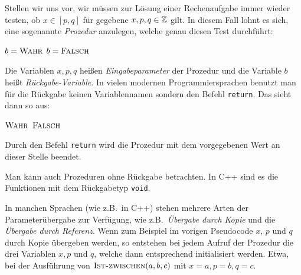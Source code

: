 \begin{bem} 
Stellen wir uns vor, wir müssen zur Lösung einer Rechenaufgabe immer wieder testen, ob $ x \in [p,q]$ für gegebene $x,p,q \in \mathbb{Z}$ gilt. In diesem Fall lohnt es sich, eine sogenannte \emph{Prozedur} anzulegen, welche genau diesen Test durchführt:

\begin{algorithm}[H]
	\caption{$b=\cc{Ist-zwischen}(x,p,q)$}
	\begin{algorithmic}
		\STATE $b=\mathop{\text{\textsc{Wahr}}}$
		\ENDIF
		\STATE $b=\mathop{\text{\textsc{Falsch}}}$
	\end{algorithmic}
\end{algorithm}

Die Variablen $x,p,q$ heißen \emph{Eingabeparameter} der Prozedur und die Variable $b$ heißt \emph{Rückgabe-Variable}. In vielen modernen Programmiersprachen benutzt man für die Rückgabe keinen Variablennamen sondern den Befehl \texttt{return}. Das sieht dann so aus: 

\begin{algorithm}[H]
	\caption{$\cc{Ist-zwischen}(x,p,q)$}
	\begin{algorithmic}
		\IF{$p \le x \le q$ oder $q \le x \le p$}
		\RETURN $\mathop{\text{\textsc{Wahr}}}$
		\ENDIF
		\RETURN $\mathop{\text{\textsc{Falsch}}}$
	\end{algorithmic}
\end{algorithm}
Durch den Befehl \texttt{return} wird die Prozedur mit dem vorgegebenen Wert an dieser Stelle beendet.

Man kann auch Prozeduren ohne Rückgabe betrachten. In C++ sind es die Funktionen mit dem Rückgabetyp \texttt{void}. 
\end{bem} 


\begin{bem} 
In manchen Sprachen (wie z.B.~in C++) stehen mehrere Arten der Parameterübergabe zur Verfügung, wie z.B.~\emph{Übergabe durch Kopie} und die \emph{Übergabe durch Referenz}. Wenn zum Beispiel im vorigen Pseudocode $x$, $p$ und $q$ durch Kopie übergeben werden, so entstehen bei jedem Aufruf der Prozedur die drei Variablen $x, p$ und $q$, welche dann entsprechend initialisiert werden. Etwa, bei der Ausführung von $\mathop{\text{\textsc{Ist-zwischen}}}(a,b,c)$ mit $x=a, p=b, q=c$. 
\end{bem} 

